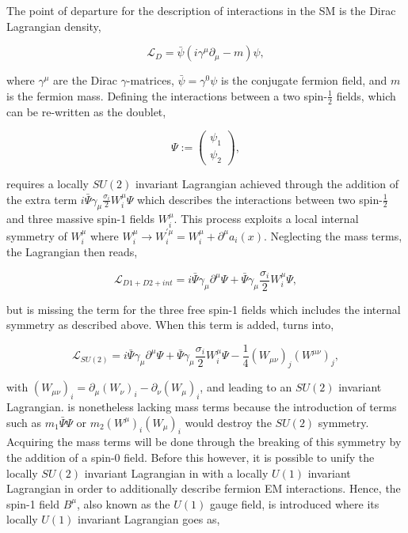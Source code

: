 The point of departure for the description of interactions in the SM is the Dirac Lagrangian density,

\begin{equation}
  \mathcal{L}_{D} = \bar{\psi}(i\gamma^\mu\partial_\mu - m)\psi,
  \label{eq:dirac}
\end{equation}

where $\gamma^\mu$ are the Dirac $\gamma$-matrices, $\bar{\psi} = \gamma^{0}\psi$ is the conjugate fermion field, and $m$ is the fermion mass. Defining the interactions between a two spin-$\frac{1}{2}$ fields, which can be re-written as the doublet, 

\begin{equation}
  \Psi := 
  \begin{pmatrix}
    \psi_{1} \\
    \psi_{2}
    \end{pmatrix},
  \label{eq:doublet}
\end{equation}

requires a locally $SU(2)$ invariant Lagrangian achieved through the addition of the extra term $i\bar{\Psi}\gamma_\mu \frac{\sigma_i}{2} W^\mu_i \Psi$ which describes the interactions between two spin-$\frac{1}{2}$ and three massive spin-1 fields $W^\mu_i$. This process exploits a local internal symmetry of $W^\mu_i$ where $W^\mu_i \rightarrow W^{'\mu}_i = W^\mu_i + \partial^\mu a_i(x)$. Neglecting the mass terms, the Lagrangian then reads,

\begin{equation}
  \mathcal{L}_{D1+D2+int} = i\bar{\Psi}\gamma_\mu\partial^\mu\Psi + \bar{\Psi}\gamma_\mu \frac{\sigma_i}{2} W^\mu_i \Psi,
  \label{eq:partialQED}
\end{equation}

but  is missing the term for the three free spin-1 fields which includes the internal symmetry as described above. When this term is added,  turns into,

\begin{equation}
  \mathcal{L}_{SU(2)} = i\bar{\Psi}\gamma_\mu\partial^\mu\Psi + \bar{\Psi}\gamma_\mu \frac{\sigma_i}{2} W^\mu_i \Psi - \frac{1}{4}(W_{\mu\nu})_{j}(W^{\mu\nu})_{j},
  \label{eq:SU2}
\end{equation}

with $(W_{\mu\nu})_i = \partial_\mu(W_\nu)_i  - \partial_\nu(W_\mu)_i$, and leading to an $SU(2)$ invariant Lagrangian.  is nonetheless lacking mass terms because the introduction of terms such as $m_{1}\bar{\Psi}{\Psi}$ or $m_{2}(W^\mu)_i(W_\mu)_i$ would destroy the $SU(2)$ symmetry. Acquiring the mass terms will be done through the breaking of this symmetry by the addition of a spin-0 field. Before this however, it is possible to unify the locally $SU(2)$ invariant Lagrangian in  with a locally $U(1)$ invariant Lagrangian in order to additionally describe fermion EM interactions. Hence, the spin-1 field $B^\mu$, also known as the $U(1)$ gauge field, is introduced where its locally $U(1)$ invariant Lagrangian goes as,

